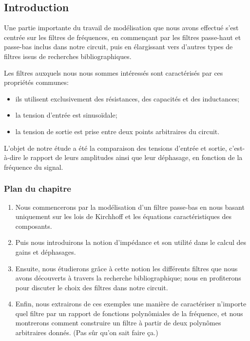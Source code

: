 \subsection*{Introduction}

Une partie importante du travail de modélisation que nous avons effectué
s'est centrée sur les filtres de fréquences,
en commençant par les filtres passe-haut et passe-bas inclus dans notre circuit,
puis en élargissant vers d'autres types de filtres issus de recherches
bibliographiques.

Les filtres auxquels nous nous sommes intéressés sont caractérisés
par ces propriétés communes:
\begin{itemize}
    \item ils utilisent exclusivement des résistances,
        des capacités et des inductances;
    \item la tension d'entrée est sinusoïdale;
    \item la tension de sortie est prise entre deux points arbitraires
        du circuit.
\end{itemize}
L'objet de notre étude a été la comparaison des tensions d'entrée et sortie,
c'est-à-dire le rapport de leurs amplitudes ainsi que leur déphasage,
en fonction de la fréquence du signal.


\subsubsection*{Plan du chapitre}
\begin{enumerate}
    \item Nous commencerons par la modélisation
        d'un filtre passe-bas en nous basant uniquement sur les lois
        de Kirchhoff et les équations caractéristiques des composants.
    \item Puis nous introduirons la notion d'impédance et son utilité
        dans le calcul des gains et déphasages.
    \item Ensuite, nous étudierons grâce à cette notion
        les différents filtres que nous avons découverts à travers
        la recherche bibliographique;
        nous en profiterons pour discuter
        le choix des filtres dans notre circuit.
    \item Enfin, nous extrairons de ces exemples une manière de caractériser
        n'importe quel filtre par un rapport de fonctions
        polynômiales de la fréquence, et nous montrerons comment construire
        un filtre à partir de deux polynômes arbitraires donnés.
        (Pas sûr qu'on sait faire ça.)
\end{enumerate}

